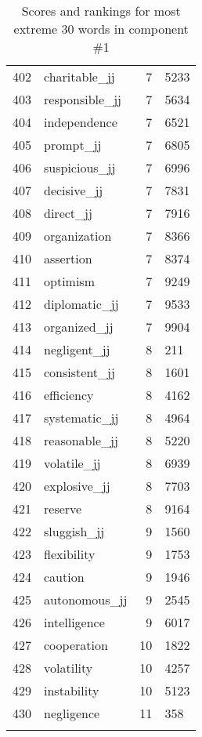 \begin{longtable}[!htbp]{| rlr@{.}l |}
    402 & charitable\_jj & 7 & 5233 \\
    403 & responsible\_jj & 7 & 5634 \\
    404 & independence & 7 & 6521 \\
    405 & prompt\_jj & 7 & 6805 \\
    406 & suspicious\_jj & 7 & 6996 \\
    407 & decisive\_jj & 7 & 7831 \\
    408 & direct\_jj & 7 & 7916 \\
    409 & organization & 7 & 8366 \\
    410 & assertion & 7 & 8374 \\
    411 & optimism & 7 & 9249 \\
    412 & diplomatic\_jj & 7 & 9533 \\
    413 & organized\_jj & 7 & 9904 \\
    414 & negligent\_jj & 8 & 211 \\
    415 & consistent\_jj & 8 & 1601 \\
    416 & efficiency & 8 & 4162 \\
    417 & systematic\_jj & 8 & 4964 \\
    418 & reasonable\_jj & 8 & 5220 \\
    419 & volatile\_jj & 8 & 6939 \\
    420 & explosive\_jj & 8 & 7703 \\
    421 & reserve & 8 & 9164 \\
    422 & sluggish\_jj & 9 & 1560 \\
    423 & flexibility & 9 & 1753 \\
    424 & caution & 9 & 1946 \\
    425 & autonomous\_jj & 9 & 2545 \\
    426 & intelligence & 9 & 6017 \\
    427 & cooperation & 10 & 1822 \\
    428 & volatility & 10 & 4257 \\
    429 & instability & 10 & 5123 \\
    430 & negligence & 11 & 358 \\
    \hline
    \caption{Scores and rankings for most extreme 30 words in component \#1} \\
\end{longtable}
